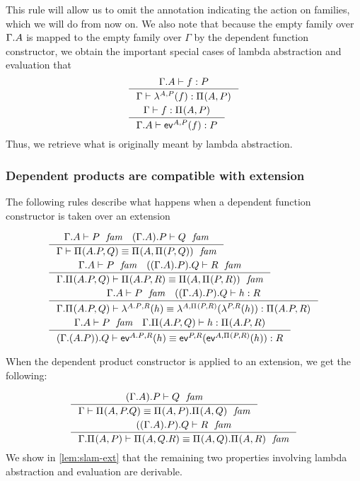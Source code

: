 This rule will allow us to omit the annotation indicating the action on families,
which we will do from now on. We also note that because the empty family over
$\ctxext{\Gamma}{A}$ is mapped to the empty family over $\Gamma$ by the
dependent function constructor, we obtain the important special cases of
lambda abstraction and evaluation that
\begin{align*}
& \inference
  { \jterm{{\Gamma}{A}}{P}{f}
    }
  { \jterm{\Gamma}{\mprd{A}{P}}{\slam{A}{P}{f}}
    }
  \\
& \inference
  { \jterm{\Gamma}{\mprd{A}{P}}{f}
    }
  { \jterm{{\Gamma}{A}}{P}{\sev{A}{P}{f}}
    }
\end{align*}
Thus, we retrieve what is originally meant by lambda abstraction.

\subsubsection{Dependent products are compatible with extension}
The following rules describe what happens when a dependent function constructor
is taken over an extension

\begin{align*}
& \inference
  { \jfam{{\Gamma}{A}}{P}
    \jfam{{{\Gamma}{A}}{P}}{Q}
    }
  { \jfameq
      {\Gamma}
      {\mprd{\ctxext{A}{P}}{Q}}
      {\mprd{A}{\mprd{P}{Q}}}
    }
  \\
& \inference
  { \jfam{{\Gamma}{A}}{P}
    \jfam{{{{\Gamma}{A}}{P}}{Q}}{R}
    }
  { \jfameq
      {{\Gamma}{\mprd{\ctxext{A}{P}}{Q}}}
      {\mprd{\ctxext{A}{P}}{R}}
      {\mprd{A}{\mprd{P}{R}}}
    }
  \\
& \inference
  { \jfam{{\Gamma}{A}}{P}
    \jterm{{{{\Gamma}{A}}{P}}{Q}}{R}{h}
    }
  { \jtermeq
      {{\Gamma}{\mprd{\ctxext{A}{P}}{Q}}}
      {\mprd{\ctxext{A}{P}}{R}}
      {\slam{\ctxext{A}{P}}{R}{h}}
      {\slam{A}{\mprd{P}{R}}{\slam{P}{R}{h}}}
    }
  \\
& \inference
  { \jfam{{\Gamma}{A}}{P}
    \jterm{{\Gamma}{\mprd{\ctxext{A}{P}}{Q}}}{\mprd{\ctxext{A}{P}}{R}}{h}
    }
  { \jtermeq
      {{{\Gamma}{{A}{P}}}{Q}}
      {R}
      {\sev{\ctxext{A}{P}}{R}{h}}
      {\sev{P}{R}{\sev{A}{\mprd{P}{R}}{h}}}
    }
\end{align*}

When the dependent product constructor is applied to an extension, we get the
following:

\begin{align*}
& \inference
  { \jfam{{{\Gamma}{A}}{P}}{Q}
    }
  { \jfameq
      {\Gamma}
      {\mprd{A}{\ctxext{P}{Q}}}
      {\ctxext{\mprd{A}{P}}{\mprd{A}{Q}}}
    }
  \\
& \inference
  { \jfam{{{{\Gamma}{A}}{P}}{Q}}{R}
    }
  { \jfameq
      {{\Gamma}{\mprd{A}{P}}}
      {\mprd{A}{\ctxext{Q}{R}}}
      {\ctxext{\mprd{A}{Q}}{\mprd{A}{R}}}
    }
\end{align*}
We show in \autoref{lem:slam-ext} that the remaining two properties
involving lambda abstraction and evaluation are derivable.

